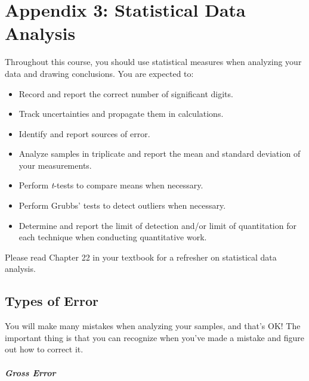 \documentclass[]{tufte-book}
\providecommand{\tightlist}{%
  \setlength{\itemsep}{0pt}\setlength{\parskip}{0pt}}
\begin{document}
\hypertarget{appendix-3-statistical-data-analysis}{%
\chapter*{Appendix 3: Statistical Data Analysis}\label{appendix-3-statistical-data-analysis}}

Throughout this course, you should use statistical measures when analyzing your data and drawing conclusions. You are expected to:

\begin{itemize}
\tightlist
\item
  Record and report the correct number of significant digits.
\item
  Track uncertainties and propagate them in calculations.
\item
  Identify and report sources of error.
\item
  Analyze samples in triplicate and report the mean and standard deviation of your measurements.
\item
  Perform \emph{t}-tests to compare means when necessary.
\item
  Perform Grubbs' tests to detect outliers when necessary.
\item
  Determine and report the limit of detection and/or limit of quantitation for each technique when conducting quantitative work.
\end{itemize}

Please read Chapter 22 in your textbook for a refresher on statistical data analysis.

\hypertarget{types-of-error}{%
\section*{Types of Error}\label{types-of-error}}

You will make many mistakes when analyzing your samples, and that's OK! The important thing is that you can recognize when you've made a mistake and figure out how to correct it.

\hypertarget{gross-error}{%
\paragraph{\texorpdfstring{\textbf{Gross Error}}{Gross Error}}\label{gross-error}}
\end{document}
